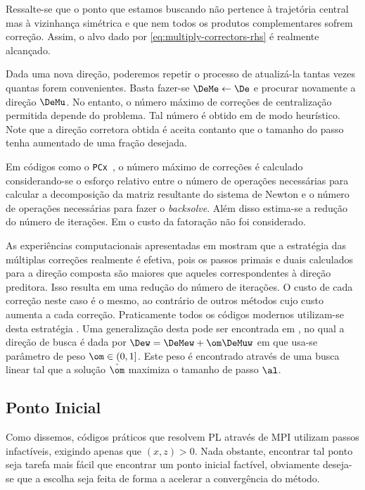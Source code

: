 Ressalte-se que o ponto que estamos buscando não pertence à trajetória central
mas à vizinhança simétrica e que nem todos os produtos complementares sofrem
correção. Assim, o alvo dado por \eqref{eq:multiply-correctors-rhs} é
realmente alcançado. 

Dada uma nova direção, poderemos repetir o processo de atualizá-la tantas vezes
quantas forem convenientes. Basta fazer-se $\DeMe  \leftarrow \De$ e procurar
novamente a direção $\DeMu$. No entanto, o número máximo de correções de
centralização permitida depende do problema. Tal número é obtido em
\cite{Gondzio:1996uw} de modo heurístico. Note que a direção corretora
obtida é aceita contanto que o tamanho do passo tenha aumentado de uma fração
desejada.


Em códigos como o \texttt{PCx}~\cite{Czyzyk:1999hk}, o
número máximo de correções é calculado considerando-se o esforço relativo entre o
número de operações necessárias para calcular a decomposição da matriz
resultante do sistema de Newton e o número de operações necessárias para fazer o
\emph{backsolve}. Além disso estima-se a redução do número de iterações. Em
\cite{Gondzio:1996uw}  o custo da fatoração não foi
considerado. 
    

As experiências computacionais apresentadas em \cite{Gondzio:1996uw}  mostram
que a estratégia das múltiplas correções realmente é efetiva, pois os passos
primais e duais calculados para a direção composta são maiores que aqueles
correspondentes à direção preditora.
Isso resulta em uma redução do número de iterações. O custo de cada
correção neste caso é o mesmo, ao contrário de outros métodos cujo custo aumenta a cada
correção. Praticamente todos os códigos modernos utilizam-se desta estratégia
\cite[Apêndice B]{Wright:Primal-dual-interior-point:1997h}. Uma generalização
desta pode ser encontrada em \cite{Colombo:2008ia}, no qual a direção de
busca é dada por $\Dew = \DeMew + \om\DeMuw$ em que usa-se parâmetro de peso
$\om\in(0,1]$. Este peso é encontrado através de uma busca linear tal que
a solução $\hat{\om}$  maximiza o tamanho de passo $\al$.



\subsection{Ponto Inicial}

Como dissemos, códigos práticos que resolvem \ac{PL} através de \ac{MPI}
utilizam passos infactíveis, exigindo apenas que $(x,z)>0$. Nada
obstante, encontrar tal ponto seja tarefa mais fácil que encontrar
um ponto inicial factível, obviamente deseja-se que a escolha seja feita de forma a
acelerar a convergência do método. 

